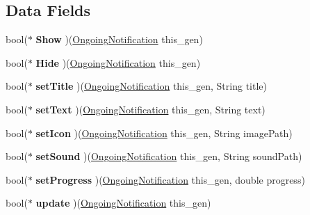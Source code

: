 \subsection*{Data Fields}
\begin{DoxyCompactItemize}
\item 
\hypertarget{struct__OngoingNotification_a420333bb1f9050adb90c4c94424b865b}{bool($\ast$ {\bfseries Show} )(\hyperlink{struct__OngoingNotification}{Ongoing\-Notification} this\-\_\-gen)}\label{struct__OngoingNotification_a420333bb1f9050adb90c4c94424b865b}

\item 
\hypertarget{struct__OngoingNotification_a1370993c1077b07b7d9fdad1bd70d2e1}{bool($\ast$ {\bfseries Hide} )(\hyperlink{struct__OngoingNotification}{Ongoing\-Notification} this\-\_\-gen)}\label{struct__OngoingNotification_a1370993c1077b07b7d9fdad1bd70d2e1}

\item 
\hypertarget{struct__OngoingNotification_afd501356adbd5c89a65fd842f06b14d5}{bool($\ast$ {\bfseries set\-Title} )(\hyperlink{struct__OngoingNotification}{Ongoing\-Notification} this\-\_\-gen, String title)}\label{struct__OngoingNotification_afd501356adbd5c89a65fd842f06b14d5}

\item 
\hypertarget{struct__OngoingNotification_a9fe2ea3927f88ab63c6e6c394634e8cb}{bool($\ast$ {\bfseries set\-Text} )(\hyperlink{struct__OngoingNotification}{Ongoing\-Notification} this\-\_\-gen, String text)}\label{struct__OngoingNotification_a9fe2ea3927f88ab63c6e6c394634e8cb}

\item 
\hypertarget{struct__OngoingNotification_a6904bac689aa654b70e00fddcadb61e6}{bool($\ast$ {\bfseries set\-Icon} )(\hyperlink{struct__OngoingNotification}{Ongoing\-Notification} this\-\_\-gen, String image\-Path)}\label{struct__OngoingNotification_a6904bac689aa654b70e00fddcadb61e6}

\item 
\hypertarget{struct__OngoingNotification_a33ba1349c8daee6549c9836d0cdb97f9}{bool($\ast$ {\bfseries set\-Sound} )(\hyperlink{struct__OngoingNotification}{Ongoing\-Notification} this\-\_\-gen, String sound\-Path)}\label{struct__OngoingNotification_a33ba1349c8daee6549c9836d0cdb97f9}

\item 
\hypertarget{struct__OngoingNotification_af6cb526a0aa24a0eb45d70fe0eae7a6b}{bool($\ast$ {\bfseries set\-Progress} )(\hyperlink{struct__OngoingNotification}{Ongoing\-Notification} this\-\_\-gen, double progress)}\label{struct__OngoingNotification_af6cb526a0aa24a0eb45d70fe0eae7a6b}

\item 
\hypertarget{struct__OngoingNotification_aa7198f036440c7ed5e7867124832c19b}{bool($\ast$ {\bfseries update} )(\hyperlink{struct__OngoingNotification}{Ongoing\-Notification} this\-\_\-gen)}\label{struct__OngoingNotification_aa7198f036440c7ed5e7867124832c19b}

\end{DoxyCompactItemize}


